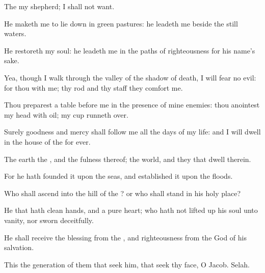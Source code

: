 {\Q {}The
{}
{} my
shepherd; I shall not
want.


\par }{\Q {}He maketh me to lie
down in
green
pastures: he
leadeth me beside the
still
waters.


\par }{\Q {}He
restoreth my
soul: he
leadeth me in the
paths of
righteousness for his
name’s sake.


\par }{\Q {}Yea, though I
walk through the
valley of the shadow of
death, I will
fear no
evil: for thou
{} with me; thy
rod and thy
staff they
comfort me.


\par }{\Q {}Thou
preparest a
table
before me in the presence of mine
enemies: thou
anointest my
head with
oil; my
cup runneth
over.


\par }{\Q {}Surely
goodness and
mercy shall
follow me all the
days of my
life: and I will
dwell in the
house of the
{} for
ever.




\par }
{\Q {}The
earth
{} the
{}, and the
fulness thereof; the
world, and they that
dwell therein.


\par }{\Q {}For he hath
founded it upon the
seas, and
established it upon the
floods.


\par }{\BB \par }
{\Q {}Who shall
ascend into the
hill of the
{}? or who shall
stand in his
holy
place?


\par }{\Q {}He that hath
clean
hands, and a
pure
heart; who hath not lifted
up his
soul unto
vanity, nor
sworn
deceitfully.


\par }{\Q {}He shall
receive the
blessing from the
{}, and
righteousness from the
God of his
salvation.


\par }{\Q {}This
{} the
generation of them that
seek him, that
seek thy
face, O
Jacob.
Selah.


\par }{\BB \par }
